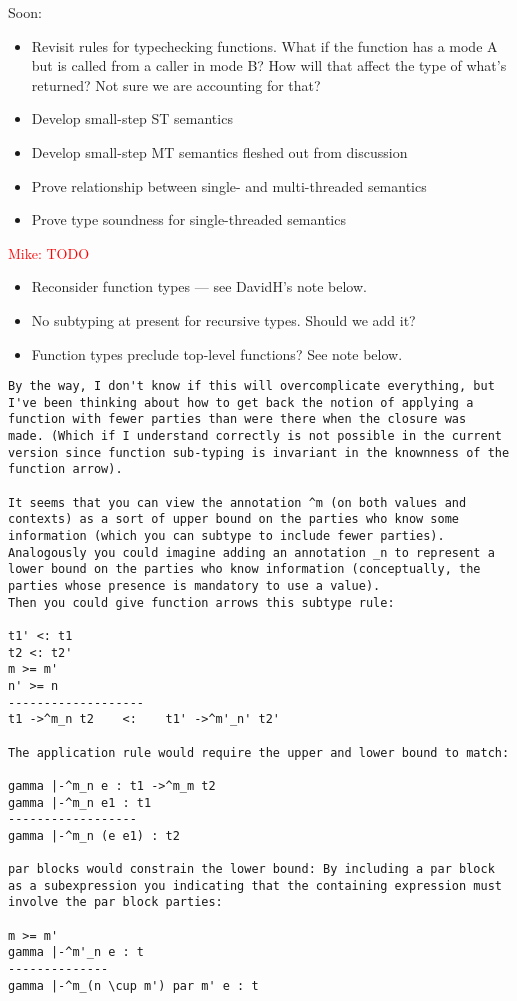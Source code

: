\documentclass[10pt]{article}
\newcommand{\mwh}[1]{\textcolor{red}{Mike: #1}}
\begin{document}
Soon:
\begin{itemize}
\item Revisit rules for typechecking functions. What if the function
  has a mode A but is called from a caller in mode B? How will that
  affect the type of what's returned? Not sure we are accounting for
  that? 
\item Develop small-step ST semantics
\item Develop small-step MT semantics fleshed out from discussion
\item Prove relationship between single- and multi-threaded semantics
\item Prove type soundness for single-threaded semantics
\end{itemize}
\mwh{TODO}
\begin{itemize}
\item Reconsider function types --- see DavidH's note below.
\item No subtyping at present for recursive types. Should we add it?
\item Function types preclude top-level functions? See note below.
\end{itemize}

\begin{verbatim}
By the way, I don't know if this will overcomplicate everything, but
I've been thinking about how to get back the notion of applying a
function with fewer parties than were there when the closure was
made. (Which if I understand correctly is not possible in the current
version since function sub-typing is invariant in the knownness of the
function arrow). 

It seems that you can view the annotation ^m (on both values and
contexts) as a sort of upper bound on the parties who know some
information (which you can subtype to include fewer parties). 
Analogously you could imagine adding an annotation _n to represent a
lower bound on the parties who know information (conceptually, the
parties whose presence is mandatory to use a value). 
Then you could give function arrows this subtype rule:

t1' <: t1
t2 <: t2'
m >= m'
n' >= n
-------------------
t1 ->^m_n t2    <:    t1' ->^m'_n' t2'

The application rule would require the upper and lower bound to match: 

gamma |-^m_n e : t1 ->^m_m t2
gamma |-^m_n e1 : t1
------------------
gamma |-^m_n (e e1) : t2

par blocks would constrain the lower bound: By including a par block
as a subexpression you indicating that the containing expression must
involve the par block parties: 

m >= m'
gamma |-^m'_n e : t
--------------
gamma |-^m_(n \cup m') par m' e : t
\end{verbatim}



  
\end{document}
